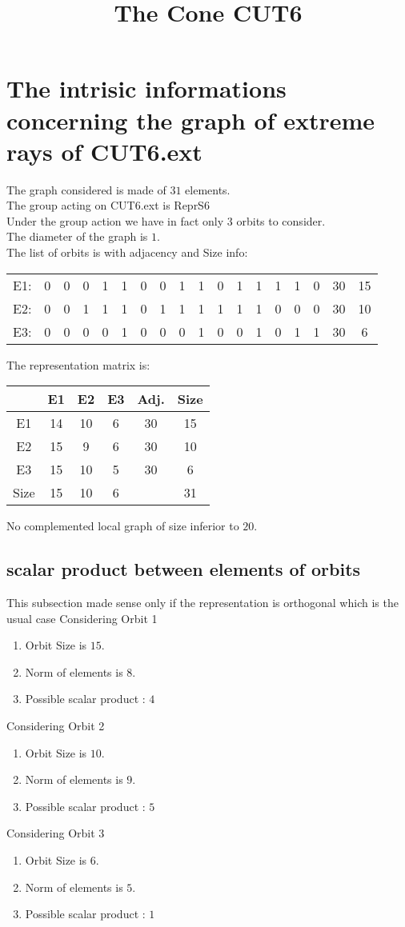 \documentclass[12pt]{article}
\title{The Cone CUT6}
\begin{document}
\maketitle
\section{The intrisic informations concerning the graph of extreme rays of CUT6.ext}
The graph considered is made of $31$ elements.\\
The group acting on CUT6.ext is ReprS6\\
Under the group action we have in fact only $3$ orbits to consider.\\
The diameter of the graph is $1$.\\
The list of orbits is with adjacency and Size info:
\begin{center}
\scriptsize
\begin{tabular}{cccccccccccccccc|c|c}
E1:&0&0&0&1&1&0&0&1&1&0&1&1&1&1&0&30&15\\
E2:&0&0&1&1&1&0&1&1&1&1&1&1&0&0&0&30&10\\
E3:&0&0&0&0&1&0&0&0&1&0&0&1&0&1&1&30&6\\
\end{tabular}
\end{center}
The representation matrix is:
\begin{center}
\scriptsize
\begin{tabular}{|c|ccc|c|c|}
\hline
&E1&E2&E3&Adj.&Size\\
\hline
E1& 14& 10& 6&30&15\\
E2& 15& 9& 6&30&10\\
E3& 15& 10& 5&30&6\\
\hline
Size&15&10&6&&31\\
\hline
\end{tabular}
\end{center}
No complemented local graph of size inferior to $20$.
\subsection{scalar product between elements of orbits}
\noindent This subsection made sense only if the representation is orthogonal which is the usual case
Considering Orbit 1
\begin{enumerate}
\item Orbit Size is $15$.
\item Norm of elements is $8$.
\item Possible scalar product : $4$
\end{enumerate}
Considering Orbit 2
\begin{enumerate}
\item Orbit Size is $10$.
\item Norm of elements is $9$.
\item Possible scalar product : $5$
\end{enumerate}
Considering Orbit 3
\begin{enumerate}
\item Orbit Size is $6$.
\item Norm of elements is $5$.
\item Possible scalar product : $1$
\end{enumerate}
\end{document}
